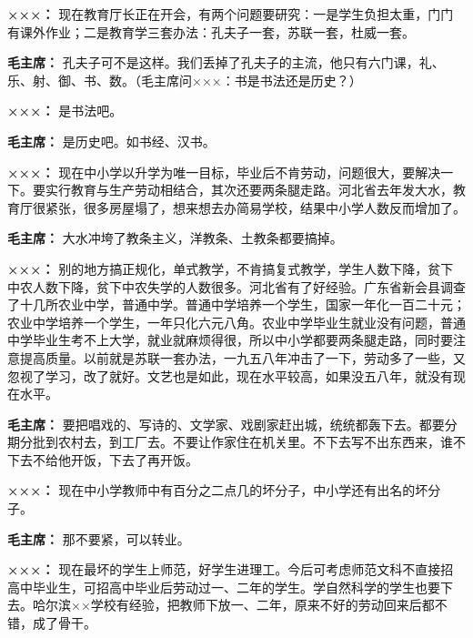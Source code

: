 \begin{duihua}
\item[\textbf{×××：}] 现在教育厅长正在开会，有两个问题要研究：一是学生负担太重，门门有课外作业；二是教育学三套办法：孔夫子一套，苏联一套，杜威一套。

\item[\textbf{毛主席：}] 孔夫子可不是这样。我们丢掉了孔夫子的主流，他只有六门课，礼、乐、射、御、书、数。（毛主席问×××：书是书法还是历史？）

\item[\textbf{×××：}] 是书法吧。

\item[\textbf{毛主席：}] 是历史吧。如书经、汉书。

\item[\textbf{×××：}] 现在中小学以升学为唯一目标，毕业后不肯劳动，问题很大，要解决一下。要实行教育与生产劳动相结合，其次还要两条腿走路。河北省去年发大水，教育厅很紧张，很多房屋塌了，想来想去办简易学校，结果中小学人数反而增加了。

\item[\textbf{毛主席：}] 大水冲垮了教条主义，洋教条、土教条都要搞掉。

\item[\textbf{×××：}] 别的地方搞正规化，单式教学，不肯搞复式教学，学生人数下降，贫下中农人数下降，贫下中农失学的人数很多。河北省有了好经验。广东省新会县调查了十几所农业中学，普通中学。普通中学培养一个学生，国家一年化一百二十元；农业中学培养一个学生，一年只化六元八角。农业中学毕业生就业没有问题，普通中学毕业生考不上大学，就业就麻烦得很，所以中小学都要两条腿走路，同时要注意提高质量。以前就是苏联一套办法，一九五八年冲击了一下，劳动多了一些，又忽视了学习，改了就好。文艺也是如此，现在水平较高，如果没五八年，就没有现在水平。

\item[\textbf{毛主席：}] 要把唱戏的、写诗的、文学家、戏剧家赶出城，统统都轰下去。都要分期分批到农村去，到工厂去。不要让作家住在机关里。不下去写不出东西来，谁不下去不给他开饭，下去了再开饭。

\item[\textbf{×××：}] 现在中小学教师中有百分之二点几的坏分子，中小学还有出名的坏分子。

\item[\textbf{毛主席：}] 那不要紧，可以转业。

\item[\textbf{×××：}] 现在最坏的学生上师范，好学生进理工。今后可考虑师范文科不直接招高中毕业生，可招高中毕业后劳动过一、二年的学生。学自然科学的学生也要下去。哈尔滨××学校有经验，把教师下放一、二年，原来不好的劳动回来后都不错，成了骨干。


\end{duihua}
